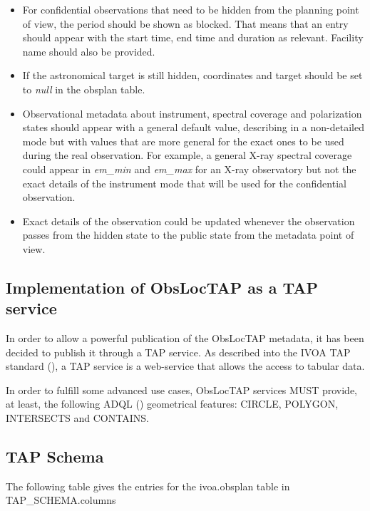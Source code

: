\documentclass[11pt,a4paper]{ivoa}
\begin{document}
\begin{itemize}
	\item For confidential observations that need to be hidden from the planning point of view, the period should be shown as blocked. That means that an entry should appear with the start time, end time and duration as relevant. Facility name should also be provided.\par

	\item If the astronomical target is still hidden, coordinates and target should be set to \textit{null} in the obsplan table.

	\item Observational metadata about instrument, spectral coverage and polarization states should appear with a general default value, describing in a non-detailed mode but with values that are more general for the exact ones to be used during the real observation. For example, a general X-ray spectral coverage could appear in \textit{em\_min} and \textit{em\_max} for an X-ray observatory but not the exact details of the instrument mode that will be used for the confidential observation.

	\item Exact details of the observation could be updated whenever the observation passes from the hidden state to the public state from the metadata point of view.
\end{itemize}

\subsection{Implementation of ObsLocTAP as a TAP service}
In order to allow a powerful publication of the ObsLocTAP metadata, it has been decided to publish it through a TAP service. As described into the IVOA TAP standard (\cite{Pat10}), a TAP service is a web-service that allows the access to tabular data.\par

In order to fulfill some advanced use cases, ObsLocTAP services MUST provide, at least, the following ADQL (\cite{Ina08}) geometrical features: CIRCLE, POLYGON, INTERSECTS and CONTAINS.\par

\subsection{TAP Schema}
The following table gives the entries for the ivoa.obsplan table in TAP\_SCHEMA.columns
\end{document}
